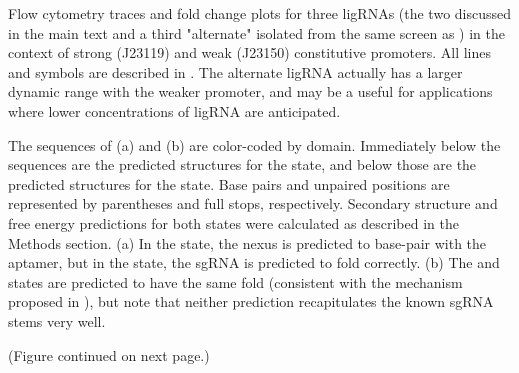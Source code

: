 \documentclass[10pt,oneside]{article}
\begin{document}

      Flow cytometry traces and fold change plots for three ligRNAs (the two discussed in the main text and a third "alternate" isolated from the same screen as \ligrnaF{}) in the context of strong (J23119) and weak (J23150) constitutive promoters.  All lines and symbols are described in .  The alternate ligRNA actually has a larger dynamic range with the weaker promoter, and may be a useful for applications where lower concentrations of ligRNA are anticipated.



     The sequences of \ligrnaF{} (a) and \ligrnaB{} (b) are color-coded by domain.  Immediately below the sequences are the predicted structures for the \apo{} state, and below those are the predicted structures for the \holo{} state.  Base pairs and unpaired positions are represented by parentheses and full stops, respectively.  Secondary structure and free energy predictions for both states were calculated as described in the Methods section.  (a) In the \apo{} state, the nexus is predicted to base-pair with the aptamer, but in the \holo{} state, the sgRNA is predicted to fold correctly.  (b) The \apo{} and \holo{} states are predicted to have the same fold (consistent with the mechanism proposed in ), but note that neither prediction recapitulates the known sgRNA stems very well.



    (Figure continued on next page.)


\end{document}
